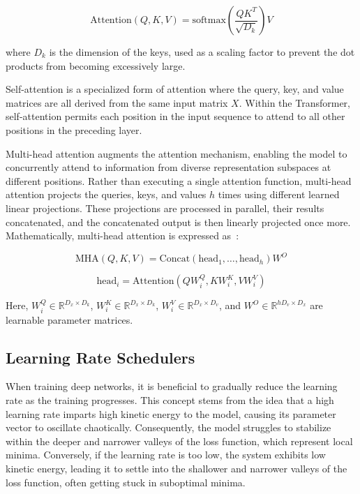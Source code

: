 \documentclass[12pt,a4paper]{report}
\begin{document}
\begin{equation}
  \text{Attention}(Q, K, V) = \text{softmax}\left(\frac{QK^T}{\sqrt{D_k}}\right) V
\end{equation}

where \( D_k \) is the dimension of the keys, used as a scaling factor to prevent the dot products from becoming excessively large.

Self-attention is a specialized form of attention where the query, key, and value matrices are all derived from the same input matrix \( X \). Within the Transformer, self-attention permits each position in the input sequence to attend to all other positions in the preceding layer.

Multi-head attention augments the attention mechanism, enabling the model to concurrently attend to information from diverse representation subspaces at different positions. Rather than executing a single attention function, multi-head attention projects the queries, keys, and values \( h \) times using different learned linear projections. These projections are processed in parallel, their results concatenated, and the concatenated output is then linearly projected once more. Mathematically, multi-head attention is expressed as~\cite{Comajoan_Cara_2024}:

\begin{equation}
  \text{MHA}(Q, K, V) = \text{Concat}(\text{head}_1, \ldots, \text{head}_h) W^O
\end{equation}

\begin{equation}
  \text{head}_i = \text{Attention}(Q W_i^Q, K W_i^K, V W_i^V)
\end{equation}

Here, \( W_i^Q \in \mathbb{R}^{D_x \times D_k} \), \( W_i^K \in \mathbb{R}^{D_x \times D_k} \), \( W_i^V \in \mathbb{R}^{D_x \times D_v} \), and \( W^O \in \mathbb{R}^{h D_v \times D_x} \) are learnable parameter matrices.


\subsection{Learning Rate Schedulers}
When training deep networks, it is beneficial to gradually reduce the learning rate as the training progresses. This concept stems from the idea that a high learning rate imparts high kinetic energy to the model, causing its parameter vector to oscillate chaotically. Consequently, the model struggles to stabilize within the deeper and narrower valleys of the loss function, which represent local minima. Conversely, if the learning rate is too low, the system exhibits low kinetic energy, leading it to settle into the shallower and narrower valleys of the loss function, often getting stuck in suboptimal minima.
\end{document}
